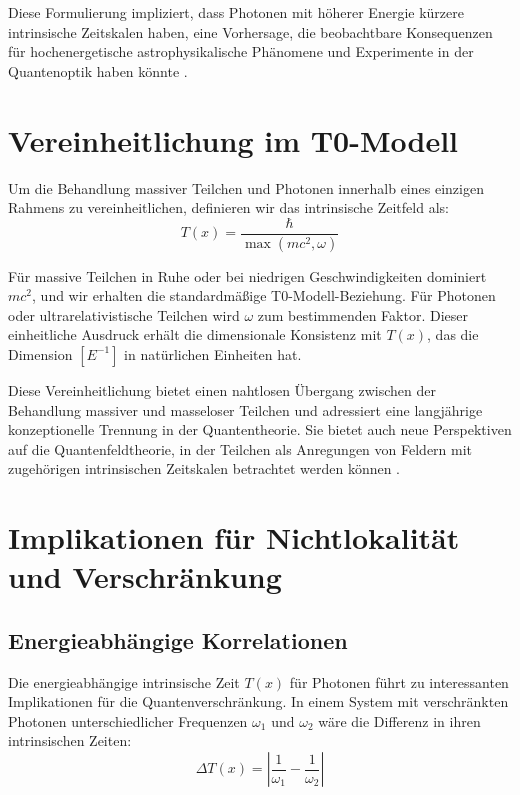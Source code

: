 \documentclass[12pt,a4paper]{article}
\newcommand{\Tfield}{T(x)}
\begin{document}
	Diese Formulierung impliziert, dass Photonen mit höherer Energie kürzere intrinsische Zeitskalen haben, eine Vorhersage, die beobachtbare Konsequenzen für hochenergetische astrophysikalische Phänomene und Experimente in der Quantenoptik haben könnte \cite{pascher_emergente_gravitation_2025}.
	
	\section{Vereinheitlichung im T0-Modell}
	Um die Behandlung massiver Teilchen und Photonen innerhalb eines einzigen Rahmens zu vereinheitlichen, definieren wir das intrinsische Zeitfeld als:
	\begin{equation}
		\Tfield = \frac{\hbar}{\max(m c^2, \omega)}
	\end{equation}
	
	Für massive Teilchen in Ruhe oder bei niedrigen Geschwindigkeiten dominiert \(m c^2\), und wir erhalten die standardmäßige T0-Modell-Beziehung. Für Photonen oder ultrarelativistische Teilchen wird \(\omega\) zum bestimmenden Faktor. Dieser einheitliche Ausdruck erhält die dimensionale Konsistenz mit \(\Tfield\), das die Dimension \([E^{-1}]\) in natürlichen Einheiten hat.
	
	Diese Vereinheitlichung bietet einen nahtlosen Übergang zwischen der Behandlung massiver und masseloser Teilchen und adressiert eine langjährige konzeptionelle Trennung in der Quantentheorie. Sie bietet auch neue Perspektiven auf die Quantenfeldtheorie, in der Teilchen als Anregungen von Feldern mit zugehörigen intrinsischen Zeitskalen betrachtet werden können \cite{pascher_feldtheorie_2025}.
	
	\section{Implikationen für Nichtlokalität und Verschränkung}
	\subsection{Energieabhängige Korrelationen}
	Die energieabhängige intrinsische Zeit \(\Tfield\) für Photonen führt zu interessanten Implikationen für die Quantenverschränkung. In einem System mit verschränkten Photonen unterschiedlicher Frequenzen \(\omega_1\) und \(\omega_2\) wäre die Differenz in ihren intrinsischen Zeiten:
	\begin{equation}
		\Delta \Tfield = \left|\frac{1}{\omega_1} - \frac{1}{\omega_2}\right|
	\end{equation}
	
\end{document}
